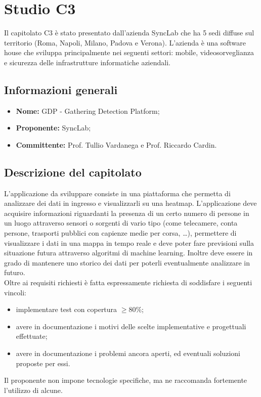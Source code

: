 \section{Studio C3}
Il capitolato C3 è stato presentato dall'azienda SyncLab che ha 5 sedi diffuse sul territorio (Roma, Napoli, Milano, Padova e Verona). L'azienda è una software house che sviluppa principalmente nei seguenti settori: mobile, videosorveglianza e sicurezza delle infrastrutture informatiche aziendali.

\subsection{Informazioni generali}
\begin{itemize}
    \item \textbf{Nome:} GDP - Gathering Detection Platform;
    \item \textbf{Proponente:} SyncLab;
    \item \textbf{Committente:} Prof. Tullio Vardanega e Prof. Riccardo Cardin.
\end{itemize}

\subsection{Descrizione del capitolato}
L'applicazione da sviluppare consiste in una piattaforma che permetta di analizzare dei dati in ingresso e visualizzarli su una heatmap. L'applicazione deve acquisire informazioni riguardanti la presenza di un certo numero di persone in un luogo attraverso sensori o sorgenti di vario tipo (come telecamere, conta persone, trasporti pubblici con capienze medie per corsa, …), permettere di visualizzare i dati in una mappa in tempo reale e deve poter fare previsioni sulla situazione futura attraverso algoritmi di machine learning. Inoltre deve essere in grado di mantenere uno storico dei dati per poterli eventualmente analizzare in futuro.\\
Oltre ai requisiti richiesti è fatta espressamente richiesta di soddisfare i seguenti vincoli:
\begin{itemize}
    \item implementare test con copertura $\geq 80\%$;
    \item avere in documentazione i motivi delle scelte implementative e progettuali effettuate;
    \item avere in documentazione i problemi ancora aperti, ed eventuali soluzioni proposte per essi.
\end{itemize}
Il proponente non impone tecnologie specifiche, ma ne raccomanda fortemente l’utilizzo di alcune.

